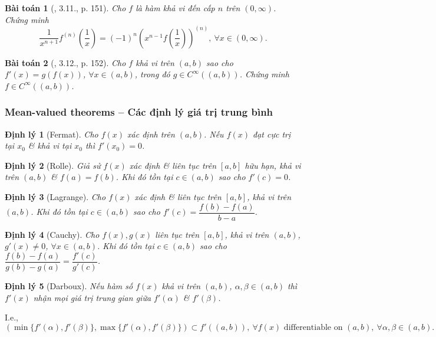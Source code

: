 \documentclass{article}
\newtheorem{baitoan}{Bài toán}
\newtheorem{dinhly}{Định lý}
\begin{document}
\begin{baitoan}[\cite{Quoc_Long_Dat_Nam_VMC}, 3.11., p. 151]
	Cho $f$ là hàm khả vi đến cấp $n$ trên $(0,\infty)$. Chứng minh
	\begin{equation*}
		\frac{1}{x^{n+1}}f^{(n)}\left(\frac{1}{x}\right) = (-1)^n\left(x^{n-1}f\left(\frac{1}{x}\right)\right)^{(n)},\ \forall x\in(0,\infty).
	\end{equation*}
\end{baitoan}

\begin{baitoan}[\cite{Quoc_Long_Dat_Nam_VMC}, 3.12., p. 152]
	Cho $f$ khả vi trên $(a,b)$ sao cho $f'(x) = g(f(x))$, $\forall x\in(a,b)$, trong đó $g\in C^\infty((a,b))$. Chứng minh $f\in C^\infty((a,b))$.
\end{baitoan}


\subsubsection{Mean-valued theorems -- Các định lý giá trị trung bình}

\begin{dinhly}[Fermat]
	Cho $f(x)$ xác định trên $(a,b)$. Nếu $f(x)$ đạt cực trị tại $x_0$ \& khả vi tại $x_0$ thì $f'(x_0) = 0$.
\end{dinhly}

\begin{dinhly}[Rolle]
	Giả sử $f(x)$ xác định \& liên tục trên $[a,b]$ hữu hạn, khả vi trên $(a,b)$ \& $f(a) = f(b)$. Khi đó tồn tại $c\in(a,b)$ sao cho $f'(c) = 0$.
\end{dinhly}

\begin{dinhly}[Lagrange]
	Cho $f(x)$ xác định \& liên tục trên $[a,b]$, khả vi trên $(a,b)$. Khi đó tồn tại $c\in(a,b)$ sao cho $f'(c) = \dfrac{f(b) - f(a)}{b - a}$.
\end{dinhly}

\begin{dinhly}[Cauchy]
	Cho $f(x),g(x)$ liên tục trên $[a,b]$, khả vi trên $(a,b)$, $g'(x)\ne0$, $\forall x\in(a,b)$. Khi đó tồn tại $c\in(a,b)$ sao cho $\dfrac{f(b) - f(a)}{g(b) - g(a)} = \dfrac{f'(c)}{g'(c)}$.
\end{dinhly}

\begin{dinhly}[Darboux]
	Nếu hàm số $f(x)$ khả vi trên $(a,b)$, $\alpha,\beta\in(a,b)$ thì $f'(x)$ nhận mọi giá trị trung gian giữa $f'(\alpha)$ \& $f'(\beta)$.
\end{dinhly}
I.e.,
\begin{equation*}
	(\min\{f'(\alpha),f'(\beta)\},\max\{f'(\alpha),f'(\beta)\})\subset f'((a,b)),\ \forall f(x)\mbox{ differentiable on }(a,b),\ \forall\alpha,\beta\in(a,b).
\end{equation*}
\end{document}
